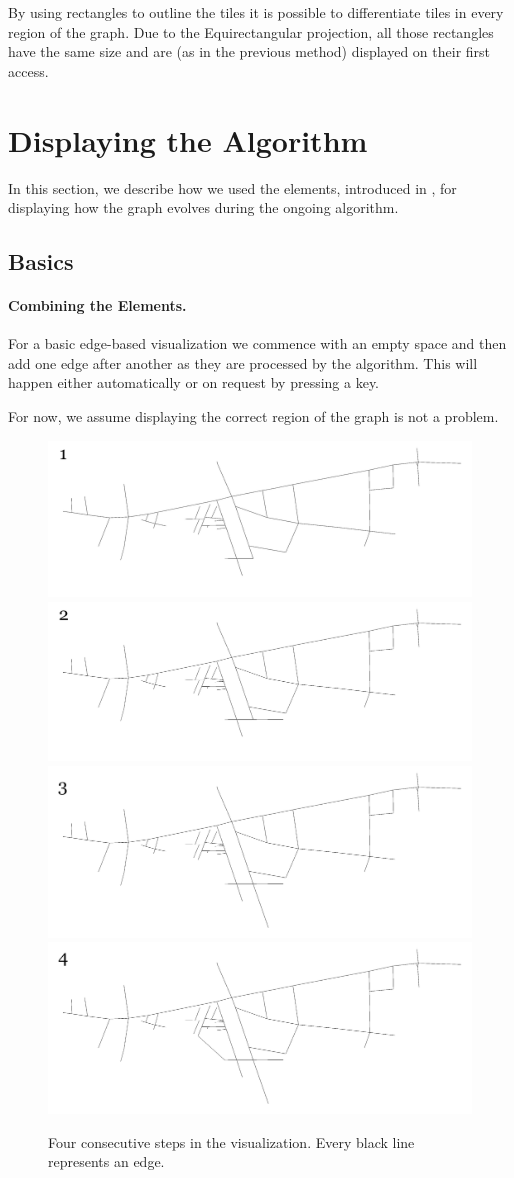 \documentclass
[
    paper = a4,
    pagesize,
    12 pt,
    oneside,                       %
    open = right,
    DIV = calc,
    BCOR = 0 mm,                   %
    bibtotoc
]
{scrbook}
\begin{document}
By using rectangles to outline the tiles it is possible to differentiate tiles in every region of the graph.
Due to the Equirectangular projection, all those rectangles have the same size and are (as in the previous method) displayed on their first access.


\section{Displaying the Algorithm} \label{algorithm}

In this section, we describe how we used the elements, introduced in , for displaying how the graph evolves during the ongoing algorithm.

\subsection{Basics} \label{basic}

\paragraph{Combining the Elements.}

For a basic edge-based visualization we commence with an empty space and then add one edge after another as they are processed by the algorithm.
This will happen either automatically or on request by pressing a key.

For now, we assume displaying the correct region of the graph is not a problem.

\begin{figure}
    \includegraphics[width=.5\textwidth]{Images/vis-step-one.png}
    \includegraphics[width=.5\textwidth]{Images/vis-step-two.png}
    \includegraphics[width=.5\textwidth]{Images/vis-step-three.png}
    \includegraphics[width=.5\textwidth]{Images/vis-step-four.png}
\caption{Four consecutive steps in the visualization. Every black line represents an edge.}
\label{fig:two-steps}
\end{figure}
\end{document}
